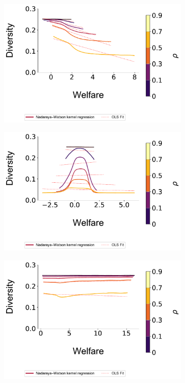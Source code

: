 \documentclass[sigconf]{acmart}
\begin{document}
\begin{figure}[t]
{\begin{minipage}{1.2\textwidth}
\hspace{-.75cm}
\begin{subfigure}{.22\textwidth}
\includegraphics[width=1.0\linewidth]{figures/diversity_welfare_rn_n_200.pdf}
\end{subfigure}
\begin{subfigure}{.22\textwidth}
\includegraphics[width=1.0\linewidth]{figures/diversity_welfare_ra_n_200.pdf}
\end{subfigure}
\begin{subfigure}{.22\textwidth}
\includegraphics[width=1.0\linewidth]{figures/diversity_welfare_rn_partial_n_200.pdf}

\end{subfigure}
\end{minipage}}
\end{figure}
\end{document}
